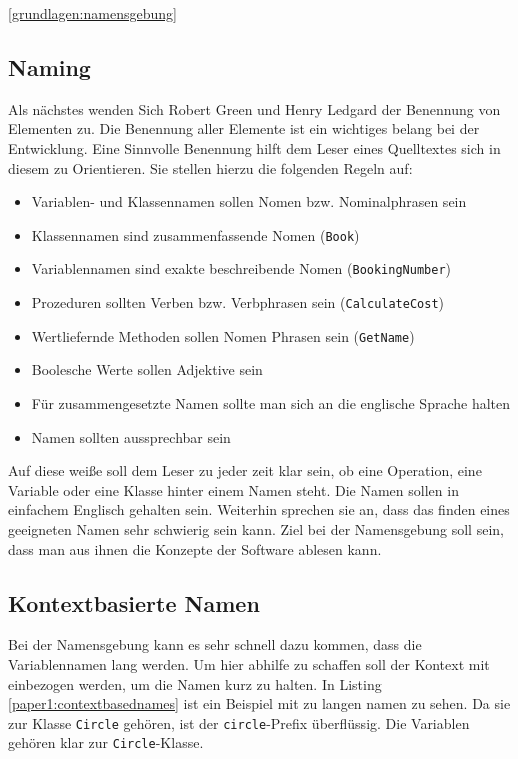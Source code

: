 \ref{grundlagen:namensgebung}

\subsection{Naming}
Als nächstes wenden Sich Robert Green und Henry Ledgard der Benennung von Elementen zu\cite[S. 3f.]{Green}. Die Benennung aller Elemente ist ein wichtiges belang bei der Entwicklung. Eine Sinnvolle Benennung hilft dem Leser eines Quelltextes sich in diesem zu Orientieren. Sie stellen hierzu die folgenden Regeln auf\cite[S. 4]{Green}:
\begin{itemize}
    \item Variablen- und Klassennamen sollen Nomen bzw. Nominalphrasen sein
    \item Klassennamen sind zusammenfassende Nomen (\texttt{Book})
    \item Variablennamen sind exakte beschreibende Nomen (\texttt{BookingNumber})
    \item Prozeduren sollten Verben bzw. Verbphrasen sein (\texttt{CalculateCost})
    \item Wertliefernde Methoden sollen Nomen Phrasen sein (\texttt{GetName})
    \item Boolesche Werte sollen Adjektive sein
    \item Für zusammengesetzte Namen sollte man sich an die englische Sprache halten
    \item Namen sollten aussprechbar sein
\end{itemize}

Auf diese weiße soll dem Leser zu jeder zeit klar sein, ob eine Operation, eine Variable oder eine Klasse hinter einem Namen steht. Die Namen sollen in einfachem Englisch gehalten sein.
Weiterhin sprechen sie an, dass das finden eines geeigneten Namen sehr schwierig sein kann. Ziel bei der Namensgebung soll sein, dass man aus ihnen die Konzepte der Software ablesen kann.


\subsection{Kontextbasierte Namen}
Bei der Namensgebung kann es sehr schnell dazu kommen, dass die Variablennamen lang werden. Um hier abhilfe zu schaffen soll der Kontext mit einbezogen werden, um die Namen kurz zu halten. In Listing \ref{paper1:contextbasednames} ist ein Beispiel mit zu langen namen zu sehen. Da sie zur Klasse \texttt{Circle} gehören, ist der \texttt{circle}-Prefix überflüssig. Die Variablen gehören klar zur \texttt{Circle}-Klasse.
\cite[S. 4f.]{Green}

